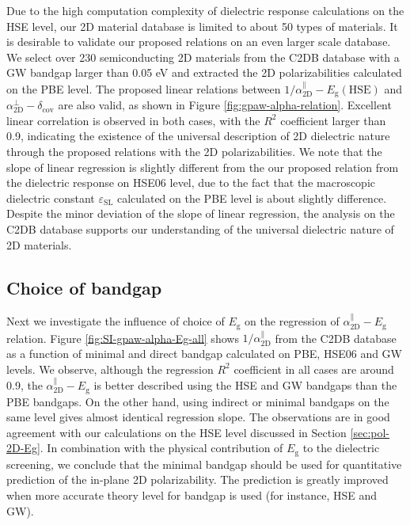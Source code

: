 \documentclass[manuscript=suppinfo,email=true,hyperref=true,keywords=false]{achemso}
\begin{document}
Due to the high computation complexity of dielectric response
calculations on the HSE level, our 2D material database is limited to
about 50 types of materials. It is desirable to validate our proposed
relations on an even larger scale database. We select over 230
semiconducting 2D materials from the C2DB database with a GW bandgap
larger than 0.05 eV and extracted the 2D polarizabilities calculated
on the PBE level. The proposed linear relations between
$1/\alpha_{\mathrm{2D}}^{\parallel}-E_{\mathrm{g}}(\mathrm{HSE})$ and
$\alpha_{\mathrm{2D}}^{\perp}-\delta_{\mathrm{cov}}$ are also valid,
as shown in Figure \ref{fig:gpaw-alpha-relation}. Excellent linear
correlation is observed in both cases, with the $R^{2}$ coefficient
larger than 0.9, indicating the existence of the universal description
of 2D dielectric nature through the proposed relations with the 2D
polarizabilities. We note that the slope of linear regression is
slightly different from the our proposed relation from the dielectric
response on HSE06 level, due to the fact that the macroscopic
dielectric constant $\varepsilon_{\mathrm{SL}}$ calculated on the PBE
level is about slightly difference. Despite the minor deviation of the
slope of linear regression, the analysis on the C2DB database supports
our understanding of the universal dielectric nature of 2D materials.

\subsection{Choice of bandgap}
\label{sec:gpaw-2}

Next we investigate the influence of choice of $E_{\mathrm{g}}$ on the
regression of $\alpha_{\mathrm{2D}}^{\parallel}-E_{\mathrm{g}}$ relation. Figure
\ref{fig:SI-gpaw-alpha-Eg-all} shows $1/\alpha_{\mathrm{2D}}^{\parallel}$ from the
C2DB database as a function of minimal and direct bandgap calculated
on PBE, HSE06 and GW levels. We observe,
although the regression $R^{2}$ coefficient in all cases are around
0.9, the $\alpha_{\mathrm{2D}}^{\parallel}-E_{\mathrm{g}}$ is better described using
the HSE and GW bandgaps than the PBE bandgaps. On the other hand,
using indirect or minimal bandgaps on the same level gives almost
identical regression slope. The observations are in good agreement
with our calculations on the HSE level discussed in Section
\ref{sec:pol-2D-Eg}. In combination with the physical contribution of
$E_{\mathrm{g}}$ to the dielectric screening, we conclude that the
minimal bandgap should be used for quantitative prediction of the
in-plane 2D polarizability. The prediction is greatly improved when
more accurate theory level for bandgap is used (for instance, HSE and GW).
\end{document}
